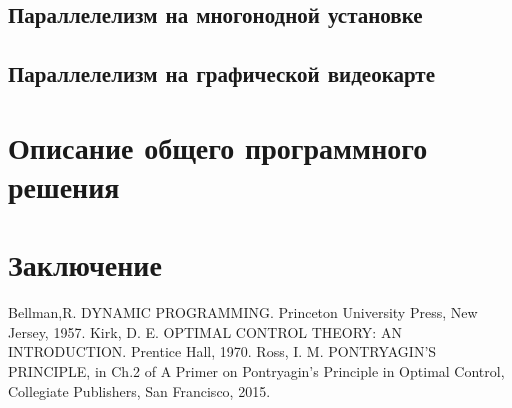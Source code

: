         \subsection{Параллелелизм на многонодной установке}
        \subsection{Параллелелизм на графической видеокарте}
    \section{Описание общего программного решения}
    \section{Заключение}
    
    \begin{thebibliography}{9}
        \bibitem{} Bellman,R. DYNAMIC PROGRAMMING. Princeton University Press, New Jersey, 1957.
        \bibitem{} Kirk, D. E. OPTIMAL CONTROL THEORY: AN INTRODUCTION. Prentice Hall, 1970.
        \bibitem{} Ross, I. M. PONTRYAGIN'S PRINCIPLE, in Ch.2 of A Primer on Pontryagin's Principle in Optimal Control, Collegiate Publishers, San Francisco, 2015.
    \end{thebibliography}




